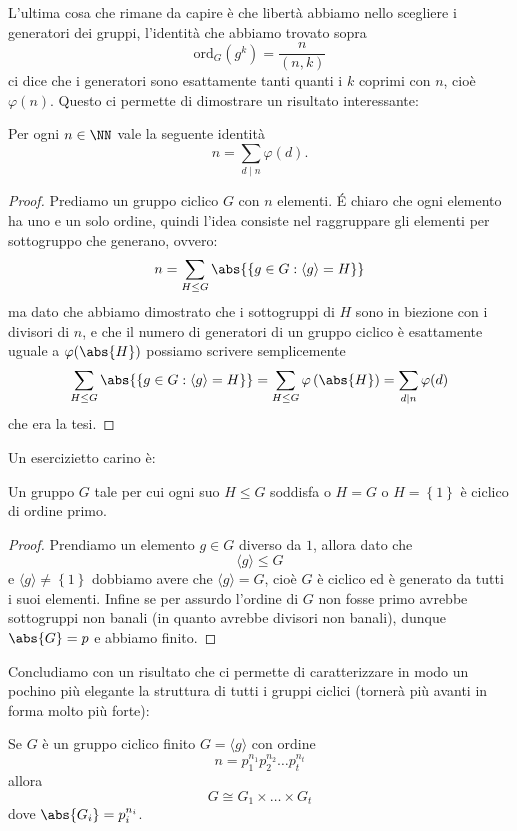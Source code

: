\documentclass[11pt]{scrartcl}
\newcommand{\ordine}[2]{\text{ord}_{#1}\left(#2\right)}
\begin{document}
	L'ultima cosa che rimane da capire è che libertà abbiamo nello scegliere i generatori dei gruppi, l'identità che abbiamo trovato sopra
	$$\ordine{G}{g^k}=\frac{n}{(n,k)}$$
	ci dice che i generatori sono esattamente tanti quanti i $k$ coprimi con $n$, cioè $\varphi(n)$. Questo ci permette di dimostrare un risultato interessante:
	\begin{proposition}
		Per ogni $n\in\NN$ vale la seguente identità
		$$n=\sum_{d\mid n}\varphi(d).$$
	\end{proposition}
	\begin{proof}
		Prediamo un gruppo ciclico $G$ con $n$ elementi. \'E chiaro che ogni elemento ha uno e un solo ordine, quindi l'idea consiste nel raggruppare gli elementi per sottogruppo che generano, ovvero:
		$$n=\sum_{H\le G}\abs{\left\{g\in G:\langle g \rangle=H \right\} }$$
		ma dato che abbiamo dimostrato che i sottogruppi di $H$ sono in biezione con i divisori di $n$, e che il numero di generatori di un gruppo ciclico è esattamente uguale a $\varphi(\abs{H})$ possiamo scrivere semplicemente
		$$\sum_{H\le G}\abs{\left\{g\in G:\langle g \rangle=H \right\} }=\sum_{H\le G}\varphi\left(\abs{H}\right)=\sum_{d\mid n}\varphi(d)$$
		che era la tesi.
	\end{proof}
	Un esercizietto carino è:
	\begin{proposition}
		Un gruppo $G$ tale per cui ogni suo $H\le G$ soddisfa o $H=G$ o $H=\left\{1\right\}$ è ciclico di ordine primo.
	\end{proposition}
	\begin{proof}
		Prendiamo un elemento $g\in G$ diverso da $1$, allora dato che
		$$\langle g \rangle \le G$$
		e $\langle g \rangle \ne \left\{1\right\}$ dobbiamo avere che $\langle g \rangle=G$, cioè $G$ è ciclico ed è generato da tutti i suoi elementi. Infine se per assurdo l'ordine di $G$ non fosse primo avrebbe sottogruppi non banali (in quanto avrebbe divisori non banali), dunque $\abs{G}=p$ e abbiamo finito.
	\end{proof}
	Concludiamo con un risultato che ci permette di caratterizzare in modo un pochino più elegante la struttura di tutti i gruppi ciclici (tornerà più avanti in forma molto più forte):
	\begin{proposition}
		Se $G$ è un gruppo ciclico finito $G=\langle g \rangle$ con ordine
		$$n=p_1^{n_1}p_2^{n_2}\dots p_t^{n_t}$$
		allora
		$$G\cong G_1\times \dots \times G_t$$
		dove $\abs{G_i}=p_i^{n_i}$.
	\end{proposition}
\end{document}
